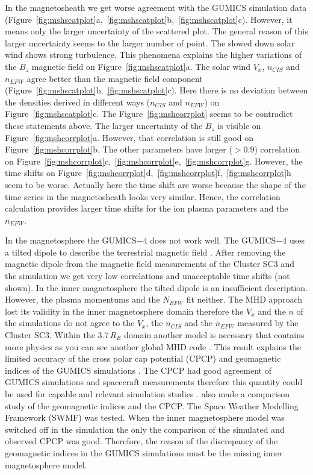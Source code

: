 \documentclass[linenumbers,draft]{agujournal}
\begin{document}
In the magnetosheath we get worse agreement with the GUMICS simulation data (Figure~\ref{fig:mshscatplot}a,~\ref{fig:mshscatplot}b,~\ref{fig:mshscatplot}c). However, it means only the larger uncertainty of the scattered plot. The general reason of this larger uncertainty seems to the larger number of point. The slowed down solar wind shows strong turbulence. This phenomena explains the higher variations of the $B_{z}$ magnetic field on Figure~\ref{fig:mshscatplot}a. The solar wind $V_{x}$, $n_{CIS}$ and $n_{EFW}$ agree better than the magnetic field component (Figure~\ref{fig:mshscatplot}b,~\ref{fig:mshscatplot}c). Here there is no deviation between the densities derived in different ways ($n_{CIS}$ and $n_{EFW}$) on Figure~\ref{fig:mshscatplot}c. The Figure~\ref{fig:mshcorrplot} seems to be contradict these statements above. The larger uncertainty of the $B_{z}$ is visible on Figure~\ref{fig:mshcorrplot}a. However, that correlation is still good on Figure~\ref{fig:mshcorrplot}b. The other parameters have larger ($>0.9$) correlation on Figure~\ref{fig:mshcorrplot}c,~\ref{fig:mshcorrplot}e,~\ref{fig:mshcorrplot}g. However, the time shifts on Figure~\ref{fig:mshcorrplot}d,~\ref{fig:mshcorrplot}f,~\ref{fig:mshcorrplot}h seem to be worse. Actually here the time shift are worse because the shape of the time series in the magnetosheath looks very similar. Hence, the correlation calculation provides larger time shifts for the ion plasma parameters and the $n_{EFW}$. 

In the magnetosphere the GUMICS$-$4 does not work well. The GUMICS$-$4 uses a tilted dipole to describe the terrestrial magnetic field \citep{janhunen12:_gumic_mhd}. After removing the magnetic dipole from the magnetic field measurements of the Cluster SC3 and the simulation we get very low correlations and unacceptable time shifts (not shown). In the inner magnetosphere the tilted dipole is an insufficient description. However, the plasma momentums and the $N_{EFW}$ fit neither. The MHD approach lost its validity in the inner magnetosphere domain therefore the $V_{x}$ and the $n$ of the simulations do not agree to the $V_{x}$, the $n_{CIS}$ and the $n_{EFW}$ measured by the Cluster SC3. Within the $3.7\,R_{E}$ domain another model is necessary that contains more physics as you can see another global MHD code \citep{lyon04:_lyon_fedder_mobar_lfm_mhd,raeder08:_openg_simul_themis_mission,powell99:_solut_adapt_upwin_schem_ideal_magnet,toth12:_adapt}. This result explains the limited accuracy of the cross polar cap potential (CPCP) and  geomagnetic indices of the GUMICS simulations \citep{juusola14:_statis_gumic_mhd}. The CPCP had good agreement of GUMICS simulations and spacecraft measurements therefore this quantity could be used for capable and relevant simulation studies \citep{lakka18:_cross_polar_cap_satur_gumic}. \citet{haiducek17:_swmf_global_magnet_simul_januar} also made a comparison study of the geomagnetic indices and the CPCP. The Space Weather Modelling Framework (SWMF) was tested. When the inner magnetosphere model was switched off in the simulation the only the comparison of the simulated and observed CPCP was good. Therefore, the reason of the discrepancy of the geomagnetic indices in the GUMICS simulations must be the missing inner magnetosphere model.
\end{document}
